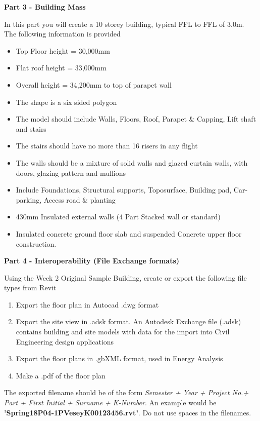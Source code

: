 \newpage
\begin{flushleft}
	\large\textbf{Part 3 - Building Mass}\\
\end{flushleft}
In this part you will create a 10 storey building, typical FFL to FFL of 3.0m. The following information is provided
\begin{itemize}
	\item Top Floor height = 30,000mm
	\item Flat roof height = 33,000mm
	\item Overall height = 34,200mm to top of parapet wall
	\item The shape is a six sided polygon
	\item The model should include Walls, Floors, Roof, Parapet \& Capping, Lift shaft and stairs
	\item The stairs should have no more than 16 risers in any flight
	\item The walls should be a mixture of solid walls and glazed curtain walls, with doors, glazing pattern and mullions
	\item Include Foundations, Structural supports, Toposurface, Building pad, Car-parking, Access road \& planting
	\item 430mm Insulated external walls (4 Part Stacked wall or standard)
	\item Insulated concrete ground floor slab and suspended Concrete upper floor construction.
\end{itemize}



\newpage
\begin{flushleft}
	\large\textbf{Part 4 - Interoperability (File Exchange formats)}\\
\end{flushleft}
Using the Week 2 Original Sample Building, create or export the following file types from Revit
\begin{enumerate}
	\item Export the floor plan in Autocad .dwg format
	\item Export the site view in .adsk format.  An Autodesk Exchange file (.adsk) contains building and site models with data for the import into Civil Engineering design applications
	\item Export the floor plans in .gbXML format, used in Energy Analysis
	\item Make a .pdf of the floor plan
\end{enumerate}
The exported filename should be of the form \textit{Semester  + Year + Project No.+ Part + First Initial + Surname + K-Number}. An example would be \textbf{'Spring18P04-1PVeseyK00123456.rvt'}.  Do not use spaces in the filenames.











